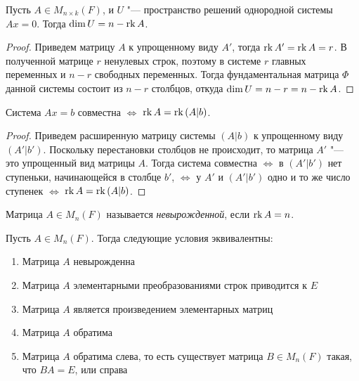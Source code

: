 \begin{theorem}
	Пусть $A \in M_{n \times k}(F)$, и $U$ "--- пространство решений однородной системы $Ax = 0$. Тогда $\dim{U} \hm{=} n - \rk{A}$.
\end{theorem}

\begin{proof}
	Приведем матрицу $A$ к упрощенному виду $A'$, тогда $\operatorname{rk}{A'} = \operatorname{rk}{A} = r$. В полученной матрице $r$ ненулевых строк, поэтому в системе $r$ главных переменных и $n - r$ свободных переменных. Тогда фундаментальная матрица $\Phi$ данной системы состоит из $n - r$ столбцов, откуда $\dim{U} = n - r = n - \operatorname{rk}{A}$.
\end{proof}

\begin{theorem}
	Система $Ax = b$ совместна $\Leftrightarrow$ $\operatorname{rk}{A} = \operatorname{rk}{(A|b)}$.
\end{theorem}

\begin{proof}
	Приведем расширенную матрицу системы $(A|b)$ к упрощенному виду $(A'|b')$. Поскольку перестановки столбцов не происходит, то матрица $A'$ "--- это упрощенный вид матрицы $A$. Тогда система совместна $\Leftrightarrow$ в $(A'|b')$ нет ступеньки, начинающейся в столбце $b'$, $\Leftrightarrow$ у $A'$ и $(A'|b')$ одно и то же число ступенек $\Leftrightarrow$ $\operatorname{rk}{A} = \operatorname{rk}{(A|b)}$.
\end{proof}

\begin{definition}
	Матрица $A \in M_{n}(F)$ называется \textit{невырожденной}, если $\operatorname{rk}{A} = n$.
\end{definition}

\begin{theorem}
	Пусть $A \in M_{n}(F)$. Тогда следующие условия эквивалентны:
	\begin{enumerate}
		\item Матрица $A$ невырожденна
		\item Матрица $A$ элементарными преобразованиями строк приводится к $E$
		\item Матрица $A$ является произведением элементарных матриц
		\item Матрица $A$ обратима
		\item Матрица $A$ обратима слева, то есть существует матрица $B \in M_n(F)$ такая, что $BA = E$, или справа
	\end{enumerate}
\end{theorem}

